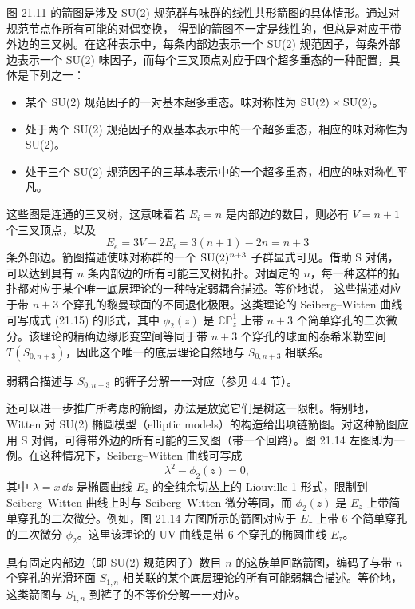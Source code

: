图 21.11 的箭图是涉及 SU(2) 规范群与味群的线性共形箭图的具体情形。通过对规范节点作所有可能的对偶变换，
得到的箭图不一定是线性的，但总是对应于带外边的三叉树。在这种表示中，每条内部边表示一个 SU(2) 规范因子，每条外部边表示一个 SU(2) 味因子，而每个三叉顶点对应于四个超多重态的一种配置，具体是下列之一：
\begin{itemize}
\item 某个 SU(2) 规范因子的一对基本超多重态。味对称性为 $\operatorname{SU}(2)\times\operatorname{SU}(2)$。
\item 处于两个 SU(2) 规范因子的双基本表示中的一个超多重态，相应的味对称性为 SU(2)。
\item 处于三个 SU(2) 规范因子的三基本表示中的一个超多重态，相应的味对称性平凡。
\end{itemize}
这些图是连通的三叉树，这意味着若 $E_i=n$ 是内部边的数目，则必有 $V=n+1$ 个三叉顶点，以及
\[
E_e=3V-2E_i=3(n+1)-2n=n+3
\]
条外部边。箭图描述使味对称群的一个 $\operatorname{SU}(2)^{n+3}$ 子群显式可见。借助 S 对偶，可以达到具有 $n$ 条内部边的所有可能三叉树拓扑。对固定的 $n$，每一种这样的拓扑都对应于某个唯一底层理论的一种特定弱耦合描述。等价地说，
这些描述对应于带 $n+3$ 个穿孔的黎曼球面的不同退化极限。这类理论的 Seiberg–Witten 曲线可写成式 (21.15) 的形式，其中 $\phi_2(z)$ 是 $\mathbb{CP}^1_z$ 上带 $n+3$ 个简单穿孔的二次微分。该理论的精确边缘形变空间等同于带 $n+3$ 个穿孔的球面的泰希米勒空间 $T(S_{0,n+3})$，因此这个唯一的底层理论自然地与 $S_{0,n+3}$ 相联系。

\begin{remark}[21.26] 弱耦合描述与 $S_{0,n+3}$ 的裤子分解一一对应（参见 4.4 节）。
\end{remark}

还可以进一步推广所考虑的箭图，办法是放宽它们是树这一限制。特别地，Witten 对 SU(2) 椭圆模型（elliptic models）的构造给出项链箭图。对这种箭图应用 S 对偶，可得带外边的所有可能的三叉图（带一个回路）。图 21.14 左图即为一例。在这种情况下，Seiberg–Witten 曲线可写成
\[
\lambda^2-\phi_2(z)=0,
\]
其中 $\lambda=x\,\dd z$ 是椭圆曲线 $E_z$ 的全纯余切丛上的 Liouville 1-形式，限制到 Seiberg–Witten 曲线上时与 Seiberg–Witten 微分等同，而 $\phi_2(z)$ 是 $E_z$ 上带简单穿孔的二次微分。例如，图 21.14 左图所示的箭图对应于 $E_\tau$ 上带 6 个简单穿孔的二次微分 $\phi_2$。这里该理论的 UV 曲线是带 6 个穿孔的椭圆曲线 $E_\tau$。

具有固定内部边（即 SU(2) 规范因子）数目 $n$ 的这族单回路箭图，编码了与带 $n$ 个穿孔的光滑环面 $S_{1,n}$ 相关联的某个底层理论的所有可能弱耦合描述。等价地，这类箭图与 $S_{1,n}$ 到裤子的不等价分解一一对应。

